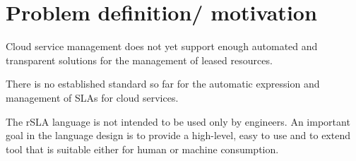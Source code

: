 \section{Problem definition/ motivation}
\label{sec:problem}
Cloud service management does not yet support enough automated and transparent solutions for the management of leased resources. 

There is no established standard so far for the automatic expression and management of SLAs for cloud services.

The rSLA language is not intended to be used only by engineers. An important goal in the language design is to provide a high-level, easy to use and 
to extend tool that is suitable either for human or machine consumption.
